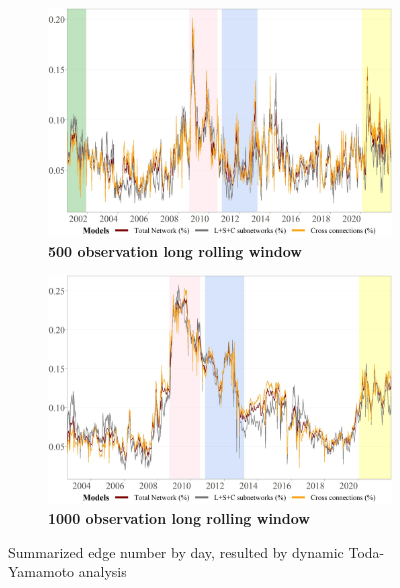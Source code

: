 \documentclass[12pt,bibliography=totoc]{article}
\begin{document}
\begin{appendices}
\begin{figure}[H]
  \begin{subfigure}[t]{.5\textwidth}
    \centering
    \includegraphics[width=\linewidth]{500edgesDistribution}
    \caption{\textbf{500 observation long rolling window}}
  \end{subfigure}
  \hfill
  \begin{subfigure}[t]{.5\textwidth}
    \centering
    \includegraphics[width=\linewidth]{1000edgesDistribution}
    \caption{\textbf{1000 observation long rolling window}}
  \end{subfigure}
\caption{Summarized edge number by day, resulted by dynamic Toda-Yamamoto analysis}
\label{fig:500and100Longwindowsizes}

\end{figure}















\end{appendices}
\end{document}
